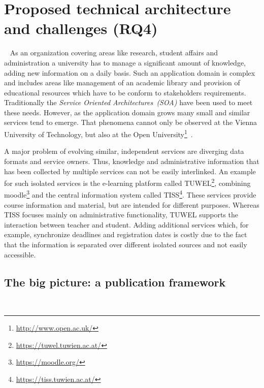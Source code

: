 \section{Proposed technical architecture and challenges (RQ4)}~\label{section:technical_architecture}
As an organization covering areas like research, student affairs and administration a university has to manage a significant amount of knowledge, adding new information on a daily basis.
Such an application domain is complex and includes areas like management of an academic library and provision of educational resources which have to be conform to stakeholders requirements. Traditionally the \textit{Service Oriented Architectures~(SOA)} have been used to meet these needs. However, as the application domain grows many small and similar services tend to emerge. That phenomena cannot only be observed at the Vienna University of Technology, but also at the Open University\footnote{\url{http://www.open.ac.uk/}}~\citet{inproceedings:zablith_consuming_2011}.

A major problem of evolving similar, independent services are diverging data formats and service owners. Thus, knowledge and administrative information that has been collected by multiple services can not be easily interlinked. An example for such isolated services is the e-learning platform called TUWEL\footnote{\url{https://tuwel.tuwien.ac.at/}}, combining moodle\footnote{\url{https://moodle.org/}} and the central information system called TISS\footnote{\url{https://tiss.tuwien.ac.at/}}. These services provide course information and material, but are intended for different purposes. Whereas TISS focuses mainly on administrative functionality, TUWEL supports the interaction between teacher and student. 
Adding additional services which, for example, synchronize deadlines and registration dates is costly due to the fact that the information is separated over different isolated sources and not easily accessible. 

\subsection{The big picture: a publication framework}~\label{section:publication_framework}

